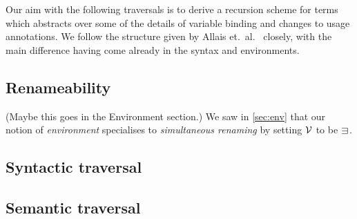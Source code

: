 Our aim with the following traversals is to derive a recursion scheme for
terms which abstracts over some of the details of variable binding and
changes to usage annotations.
We follow the structure given by Allais et.\ al.~\cite{AACMM20} closely, with
the main difference having come already in the syntax and environments.

\subsection{Renameability}

{\color{red}(Maybe this goes in the Environment section.)}
We saw in \cref{sec:env} that our notion of \emph{environment} specialises to
\emph{simultaneous renaming} by setting $\mathcal V$ to be $\sqni$.


\subsection{Syntactic traversal}

\subsection{Semantic traversal}

